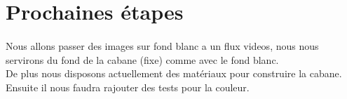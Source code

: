 \documentclass{article}
\begin{document}
\section{Prochaines étapes}
\paragraph{}
Nous allons passer des images sur fond blanc a un flux videos, nous nous servirons du fond de la cabane (fixe) comme avec le fond blanc. \\
De plus nous disposons actuellement des matériaux pour construire la cabane. \\
Ensuite il nous faudra rajouter des tests pour la couleur.
\end{document}

